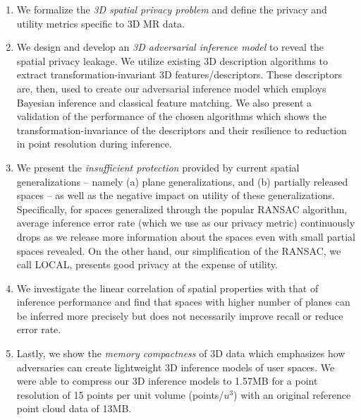 \begin{enumerate}

	\item We formalize the \textit{3D spatial privacy problem} and define the privacy and utility metrics specific to 3D MR data.
	\item We design and develop an \textit{3D adversarial inference model} to reveal the spatial privacy leakage. We utilize existing 3D description algorithms to extract transformation-invariant 3D features/descriptors. These descriptors are, then, used to create our adversarial inference model which employs Bayesian inference and classical feature matching. We also present a validation of the performance of the chosen algorithms which shows the transformation-invariance of the descriptors and their resilience to reduction in point resolution during inference.%
	\item We present the \textit{insufficient protection} provided by current spatial generalizations -- namely (a) plane generalizations, and (b) partially released spaces -- as well as the negative impact on utility of these generalizations. Specifically, for spaces generalized through the popular RANSAC algorithm, average inference error rate (which we use as our privacy metric) continuously drops as we release more information about the spaces even with small partial spaces revealed. On the other hand, our simplification of the RANSAC, we call LOCAL, presents good privacy at the expense of utility. 
	\item We investigate the linear correlation of spatial properties with that of inference performance and find that spaces with higher number of planes can be inferred more precisely but does not necessarily improve recall or reduce error rate.
	\item Lastly, we show the \textit{memory compactness} of 3D data which emphasizes how adversaries can create lightweight 3D inference models of user spaces. We were able to compress our 3D inference models to 1.57MB for a point resolution of 15 points per unit volume (points/$u^3$) with an original reference point cloud data of 13MB.
\end{enumerate}

